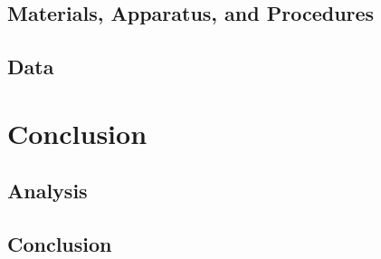 \documentclass[12 pt]{report}
\begin{document}
\section{Materials, Apparatus, and Procedures} \label{m_a_p}


\section{Data} \label{data}


\chapter{Conclusion} \label{conclusion-chapter}
\section{Analysis} \label{analysis}


\section{Conclusion} \label{conclusion-section}


\printbibliography[heading=subbibintoc]
\end{document}

